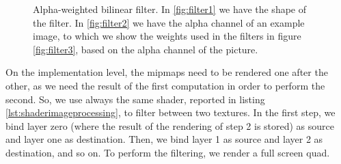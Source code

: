 \begin{figure}
\centering
{} 
\caption{Alpha-weighted bilinear filter. In \ref{fig:filter1} we have the shape of the filter. In \ref{fig:filter2} we have the alpha channel of an example image, to which we show the weights used in the filters in figure \ref{fig:filter3}, based on the alpha channel of the picture.}
\label{fig:filters}
\end{figure}

On the implementation level, the mipmaps need to be rendered one after the other, as we need the result of the first computation in order to perform the second. So, we use always the same shader, reported in listing \ref{lst:shaderimageprocessing}, to filter between two textures. In the first step, we bind layer zero (where the result of the rendering of step 2 is stored) as source and layer one as destination. Then, we bind layer 1 as source and layer 2 as destination, and so on. To perform the filtering, we render a full screen quad.

